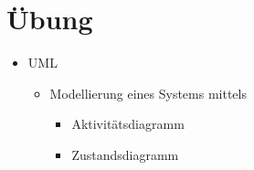 \section{\"Ubung}
\begin{itemize}
    \item UML\begin{itemize}
              \item Modellierung eines Systems mittels\begin{itemize}
                        \item Aktivit\"atsdiagramm
                        \item Zustandsdiagramm
                    \end{itemize}
          \end{itemize}
\end{itemize}